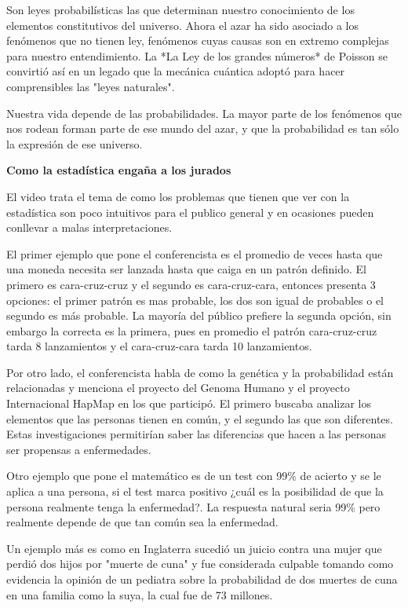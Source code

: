 \documentclass{article}[12pt]
\begin{document}
    Son leyes probabilísticas las que determinan nuestro conocimiento de los elementos constitutivos del universo. Ahora el azar ha sido asociado a los fenómenos que no tienen ley, fenómenos cuyas causas son en extremo complejas para nuestro entendimiento. La *La Ley de los grandes números* de Poisson se convirtió así en un legado que la mecánica cuántica adoptó para hacer comprensibles las "leyes naturales".

    Nuestra vida depende de las probabilidades. La mayor parte de los fenómenos que nos rodean forman parte de ese mundo del azar, y que la probabilidad es tan sólo la expresión de ese universo.
    
    \newpage
    \begin{center}
        \large \textbf{Como la estadística engaña a los jurados}
    \end{center}

    El video trata el tema de como los problemas que tienen que ver con la estadística son poco intuitivos para el publico general y en ocasiones pueden conllevar a malas interpretaciones. 

    El primer ejemplo que pone el conferencista es el promedio de veces hasta que una moneda necesita ser lanzada hasta que caiga en un patrón definido. El primero es cara-cruz-cruz y el segundo es cara-cruz-cara, entonces presenta 3 opciones: el primer patrón es mas probable, los dos son igual de probables o el segundo es más probable. La mayoría del público prefiere la segunda opción, sin embargo la correcta es la primera, pues en promedio el patrón cara-cruz-cruz tarda 8 lanzamientos y el cara-cruz-cara tarda 10 lanzamientos. 

    Por otro lado, el conferencista habla de como la genética y la probabilidad están relacionadas y menciona el proyecto del Genoma Humano y  el proyecto Internacional HapMap en los que participó.  El primero buscaba analizar los elementos que las personas tienen en común, y el segundo las que son diferentes. Estas investigaciones permitirían saber las diferencias que hacen a las personas ser propensas a enfermedades.

    Otro ejemplo que pone el matemático es de un test con 99\% de acierto y se le aplica a una persona, si el test marca positivo ¿cuál es la posibilidad de que la persona realmente tenga la enfermedad?. La respuesta natural seria 99\% pero realmente depende de que tan común sea la enfermedad. 

    Un ejemplo más es como en Inglaterra sucedió un juicio contra una mujer que perdió dos hijos por "muerte de cuna" y fue considerada culpable tomando como evidencia la opinión de un pediatra sobre la probabilidad de dos muertes de cuna en una familia como la suya, la cual fue de 73 millones. 
\end{document}
